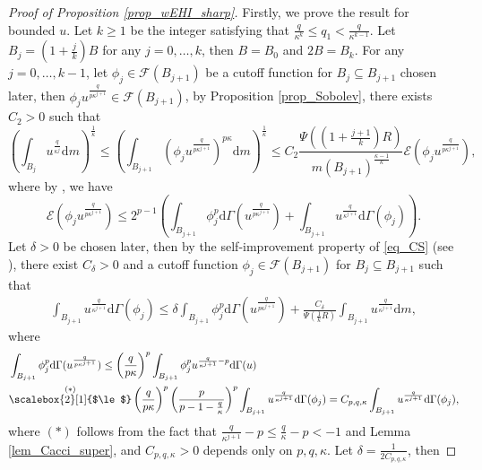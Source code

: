 \documentclass[11pt,a4paper]{article}
\numberwithin{equation}{section}
\theoremstyle{plain}
\theoremstyle{definition}
\begin{document}
\begin{proof}[Proof of Proposition \ref{prop_wEHI_sharp}]
Firstly, we prove the result for bounded $u$. Let $k\ge1$ be the integer satisfying that $\frac{q}{\kappa^k}\le q_1 <\frac{q}{\kappa^{k-1}}$. Let $B_j=(1+\frac{j}{k})B$ for any $j=0,\ldots,k$, then $B=B_0$ and $2B=B_k$. For any $j=0,\ldots,k-1$, let $\phi_j\in \mathcal{F}(B_{j+1})$ be a cutoff function for $B_j\subseteq B_{j+1}$ chosen later, then $\phi_ju^{\frac{q}{p\kappa^{j+1}}}\in \mathcal{F}(B_{j+1})$, by Proposition \ref{prop_Sobolev}, there exists $C_2>0$ such that
\begin{equation}\label{eq_wEHI_sharpA}
\left(\int_{B_j}u^{\frac{q}{\kappa^j}}\mathrm{d}m\right)^{\frac{1}{\kappa}}\le\left(\int_{B_{j+1}}\left(\phi_ju^{\frac{q}{p\kappa^{j+1}}}\right)^{p\kappa}\mathrm{d}m\right)^{\frac{1}{\kappa}}\le C_2 \frac{\Psi((1+\frac{j+1}{k})R)}{m(B_{j+1})^{\frac{\kappa-1}{\kappa}}}\mathcal{E}(\phi_ju^{\frac{q}{p\kappa^{j+1}}}),
\end{equation}
where by \cite[Lemma 6.1]{Yan25c}, we have
\begin{equation}\label{eq_wEHI_sharpB}
\mathcal{E}(\phi_ju^{\frac{q}{p\kappa^{j+1}}})\le 2^{p-1}\left(\int_{B_{j+1}}\phi_j^p \mathrm{d}\Gamma(u^{\frac{q}{p\kappa^{j+1}}})+\int_{B_{j+1}}u^{\frac{q}{\kappa^{j+1}}}\mathrm{d}\Gamma(\phi_j)\right).
\end{equation}
Let $\delta>0$ be chosen later, then by the self-improvement property of \ref{eq_CS} (see \cite[Proposition 3.1]{Yan25c}), there exist $C_\delta>0$ and a cutoff function $\phi_j\in \mathcal{F}(B_{j+1})$ for $B_j\subseteq B_{j+1}$ such that
\begin{align*}
\int_{B_{j+1}}u^{\frac{q}{\kappa^{j+1}}}\mathrm{d}\Gamma(\phi_j)\le \delta\int_{B_{j+1}}\phi_j^p \mathrm{d}\Gamma(u^{\frac{q}{p\kappa^{j+1}}})+\frac{C_\delta}{\Psi(\frac{1}{k}R)}\int_{B_{j+1}}u^{\frac{q}{\kappa^{j+1}}} \mathrm{d}m,
\end{align*}
where
\begin{align}
&\int_{B_{j+1}}\phi_j^p \mathrm{d}\Gamma(u^{\frac{q}{p\kappa^{j+1}}})\le \left(\frac{q}{p\kappa}\right)^p\int_{B_{j+1}}\phi_j^pu^{\frac{q}{\kappa^{j+1}}-p}\mathrm{d}\Gamma(u)\nonumber\\
&\overset{(*)}{\scalebox{2}[1]{$\le$}}\left(\frac{q}{p\kappa}\right)^p \left(\frac{p}{p-1-\frac{q}{\kappa}}\right)^p\int_{B_{j+1}}u^{\frac{q}{\kappa^{j+1}}}\mathrm{d}\Gamma(\phi_j)=C_{p,q,\kappa}\int_{B_{j+1}}u^{\frac{q}{\kappa^{j+1}}}\mathrm{d}\Gamma(\phi_j),\label{eq_wEHI_sharpC}
\end{align}
where $(*)$ follows from the fact that $\frac{q}{\kappa^{j+1}}-p\le \frac{q}{\kappa}-p<-1$ and Lemma \ref{lem_Cacci_super}, and $C_{p,q,\kappa}>0$ depends only on $p,q,\kappa$. Let $\delta=\frac{1}{2C_{p,q,\kappa}}$, then

\end{proof}
\end{document}
